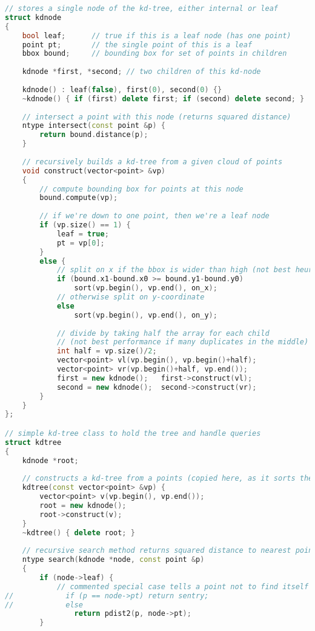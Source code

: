 \begin{lstlisting}[language=C++]
// stores a single node of the kd-tree, either internal or leaf
struct kdnode 
{
    bool leaf;      // true if this is a leaf node (has one point)
    point pt;       // the single point of this is a leaf
    bbox bound;     // bounding box for set of points in children
    
    kdnode *first, *second; // two children of this kd-node
    
    kdnode() : leaf(false), first(0), second(0) {}
    ~kdnode() { if (first) delete first; if (second) delete second; }
    
    // intersect a point with this node (returns squared distance)
    ntype intersect(const point &p) {
        return bound.distance(p);
    }
    
    // recursively builds a kd-tree from a given cloud of points
    void construct(vector<point> &vp)
    {
        // compute bounding box for points at this node
        bound.compute(vp);
        
        // if we're down to one point, then we're a leaf node
        if (vp.size() == 1) {
            leaf = true;
            pt = vp[0];
        }
        else {
            // split on x if the bbox is wider than high (not best heuristic...)
            if (bound.x1-bound.x0 >= bound.y1-bound.y0)
                sort(vp.begin(), vp.end(), on_x);
            // otherwise split on y-coordinate
            else
                sort(vp.begin(), vp.end(), on_y);
            
            // divide by taking half the array for each child
            // (not best performance if many duplicates in the middle)
            int half = vp.size()/2;
            vector<point> vl(vp.begin(), vp.begin()+half);
            vector<point> vr(vp.begin()+half, vp.end());
            first = new kdnode();   first->construct(vl);
            second = new kdnode();  second->construct(vr);            
        }
    }
};

// simple kd-tree class to hold the tree and handle queries
struct kdtree
{
    kdnode *root;
    
    // constructs a kd-tree from a points (copied here, as it sorts them)
    kdtree(const vector<point> &vp) {
        vector<point> v(vp.begin(), vp.end());
        root = new kdnode();
        root->construct(v);
    }
    ~kdtree() { delete root; }
    
    // recursive search method returns squared distance to nearest point
    ntype search(kdnode *node, const point &p)
    {
        if (node->leaf) {
            // commented special case tells a point not to find itself
//            if (p == node->pt) return sentry;
//            else               
                return pdist2(p, node->pt);
        }
        

\end{lstlisting}
